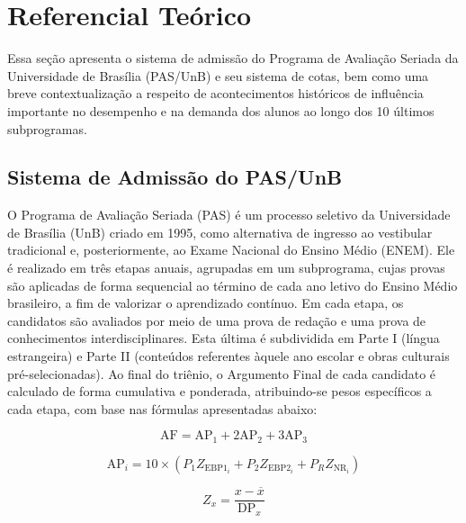 \documentclass[12pt]{article}
\begin{document}
\section{Referencial Teórico}

Essa seção apresenta o sistema de admissão do Programa de Avaliação Seriada da Universidade de Brasília (PAS/UnB) e seu sistema de cotas, bem como uma breve contextualização a respeito de acontecimentos históricos de influência importante no desempenho e na demanda dos alunos ao longo dos 10 últimos subprogramas.

\subsection{Sistema de Admissão do PAS/UnB}

O Programa de Avaliação Seriada (PAS) é um processo seletivo da Universidade de Brasília (UnB) criado em 1995, como alternativa de ingresso ao vestibular tradicional e, posteriormente, ao Exame Nacional do Ensino Médio (ENEM). Ele é realizado em três etapas anuais, agrupadas em um subprograma, cujas provas são aplicadas de forma sequencial ao término de cada ano letivo do Ensino Médio brasileiro, a fim de valorizar o aprendizado contínuo. Em cada etapa, os candidatos são avaliados por meio de uma prova de redação e uma prova de conhecimentos interdisciplinares. Esta última é subdividida em Parte I (língua estrangeira) e Parte II (conteúdos referentes àquele ano escolar e obras culturais pré-selecionadas). Ao final do triênio, o Argumento Final de cada candidato é calculado de forma cumulativa e ponderada, atribuindo-se pesos específicos a cada etapa, com base nas fórmulas apresentadas abaixo:

\begin{equation}
    \mathrm{AF} = \mathrm{AP}_1 + 2\mathrm{AP}_2 + 3\mathrm{AP}_3
\end{equation}

\begin{equation}
    \mathrm{AP}_i = 10 \times (P_{1} Z_{\mathrm{EBP1}_i} + P_{2} Z_{\mathrm{EBP2}_i} + P_{R} Z_{\mathrm{NR}_i})
\end{equation}

\begin{equation}
    Z_x = \frac{x - \overline{x}}{\mathrm{DP}_x}
\end{equation}
\end{document}
